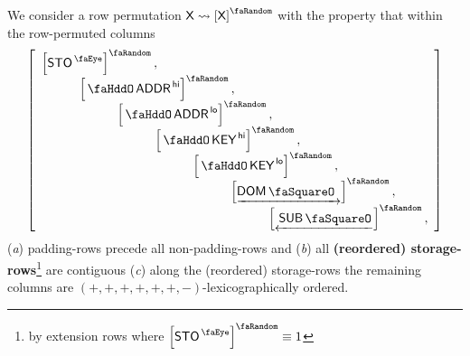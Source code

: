 We consider a row permutation $\col{X}\rightsquigarrow\order{\col{X}}$ with the property that within the row-permuted columns
\[
	\left[ \begin{array}{l}
		\order{\peekStorage}, \\
		\quad\quad\quad \order{\stoAddressHi}, \\
		\quad\quad\quad \quad\quad\quad \order{\stoAddressLo}, \\
		\quad\quad\quad \quad\quad\quad \quad\quad\quad \order{\stoKeyHi}, \\
		\quad\quad\quad \quad\quad\quad \quad\quad\quad \quad\quad\quad \order{\stoKeyLo}, \\
		\quad\quad\quad \quad\quad\quad \quad\quad\quad \quad\quad\quad \quad\quad\quad \order{\domStamp}, \\
		\quad\quad\quad \quad\quad\quad \quad\quad\quad \quad\quad\quad \quad\quad\quad \quad\quad\quad \order{\subStamp}, \\
	\end{array} \right]
\]
\noindent
(\emph{a}) padding-rows precede all non-padding-rows and
(\emph{b}) all \textbf{(reordered) storage-rows}\footnote{by extension rows where $\order{\peekStorage} \equiv 1$} are contiguous
(\emph{c}) along the (reordered) storage-rows the remaining columns are $(+, +, +, +, +, +, -)$-lexicographically ordered.
